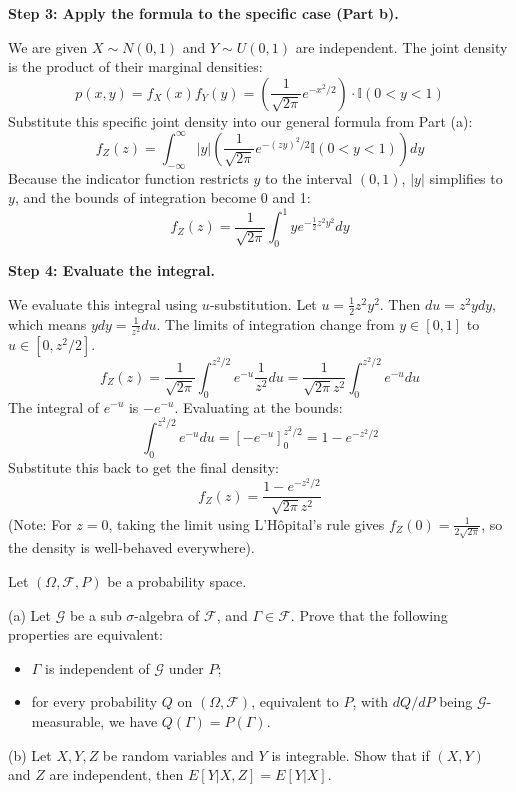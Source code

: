 \begin{solution}
\textbf{Step 3: Apply the formula to the specific case (Part b).}

We are given $X \sim N(0,1)$ and $Y \sim U(0,1)$ are independent.
The joint density is the product of their marginal densities:
\[ p(x,y) = f_X(x) f_Y(y) = \left( \frac{1}{\sqrt{2\pi}} e^{-x^2/2} \right) \cdot \mathbb{I}(0 < y < 1) \]
Substitute this specific joint density into our general formula from Part (a):
\[ f_Z(z) = \int_{-\infty}^{\infty} |y| \left( \frac{1}{\sqrt{2\pi}} e^{-(zy)^2/2} \mathbb{I}(0 < y < 1) \right) dy \]
Because the indicator function restricts $y$ to the interval $(0, 1)$, $|y|$ simplifies to $y$, and the bounds of integration become 0 and 1:
\[ f_Z(z) = \frac{1}{\sqrt{2\pi}} \int_{0}^{1} y e^{-\frac{1}{2} z^2 y^2} dy \]

\textbf{Step 4: Evaluate the integral.}

We evaluate this integral using $u$-substitution. Let $u = \frac{1}{2} z^2 y^2$.
Then $du = z^2 y dy$, which means $y dy = \frac{1}{z^2} du$.
The limits of integration change from $y \in [0, 1]$ to $u \in [0, z^2/2]$.
\[ f_Z(z) = \frac{1}{\sqrt{2\pi}} \int_{0}^{z^2/2} e^{-u} \frac{1}{z^2} du = \frac{1}{\sqrt{2\pi} z^2} \int_{0}^{z^2/2} e^{-u} du \]
The integral of $e^{-u}$ is $-e^{-u}$. Evaluating at the bounds:
\[ \int_{0}^{z^2/2} e^{-u} du = \left[ -e^{-u} \right]_0^{z^2/2} = 1 - e^{-z^2/2} \]
Substitute this back to get the final density:
\[ f_Z(z) = \frac{1 - e^{-z^2/2}}{\sqrt{2\pi} z^2} \]
(Note: For $z=0$, taking the limit using L'Hôpital's rule gives $f_Z(0) = \frac{1}{2\sqrt{2\pi}}$, so the density is well-behaved everywhere).
\end{solution}

\begin{exercise}\label{probability:2014:8}
Let $(\Omega, \mathcal{F}, P)$ be a probability space.

(a) Let $\mathcal{G}$ be a sub $\sigma$-algebra of $\mathcal{F}$, and $\Gamma \in \mathcal{F}$. Prove that the following properties are equivalent:
\begin{itemize}
\item[(i)] $\Gamma$ is independent of $\mathcal{G}$ under $P$;
\item[(ii)] for every probability $Q$ on $(\Omega, \mathcal{F})$, equivalent to $P$, with $dQ/dP$ being $\mathcal{G}$-measurable, we have $Q(\Gamma) = P(\Gamma)$.
\end{itemize}

(b) Let $X, Y, Z$ be random variables and $Y$ is integrable. Show that if $(X,Y)$ and $Z$ are independent, then $E[Y | X, Z] = E[Y | X]$.
\end{exercise}

